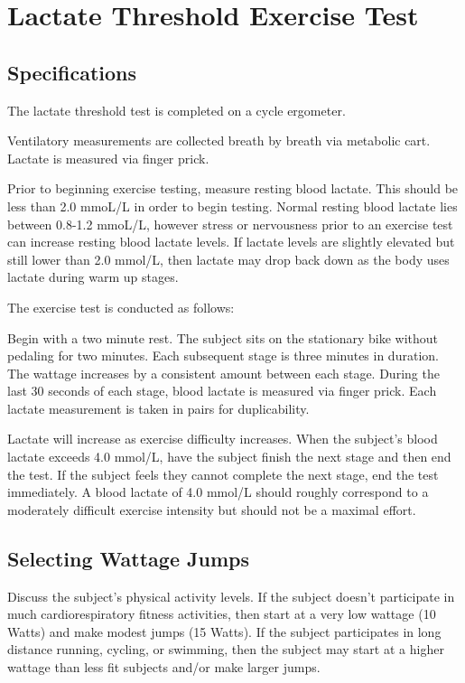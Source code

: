 \documentclass[
]{book}
\begin{document}
\hypertarget{ExerciseTesting-LT}{%
\section{Lactate Threshold Exercise Test}\label{ExerciseTesting-LT}}

\hypertarget{ExerciseTesting-LT-Specs}{%
\subsection{Specifications}\label{ExerciseTesting-LT-Specs}}

The lactate threshold test is completed on a cycle ergometer.

Ventilatory measurements are collected breath by breath via metabolic cart.
Lactate is measured via finger prick.

Prior to beginning exercise testing, measure resting blood lactate. This should be less than 2.0 mmoL/L in order to begin testing. Normal resting blood lactate lies between 0.8-1.2 mmoL/L, however stress or nervousness prior to an exercise test can increase resting blood lactate levels. If lactate levels are slightly elevated but still lower than 2.0 mmol/L, then lactate may drop back down as the body uses lactate during warm up stages.

The exercise test is conducted as follows:

Begin with a two minute rest. The subject sits on the stationary bike without pedaling for two minutes.
Each subsequent stage is three minutes in duration. The wattage increases by a consistent amount between each stage. During the last 30 seconds of each stage, blood lactate is measured via finger prick. Each lactate measurement is taken in pairs for duplicability.

Lactate will increase as exercise difficulty increases. When the subject's blood lactate exceeds 4.0 mmol/L, have the subject finish the next stage and then end the test. If the subject feels they cannot complete the next stage, end the test immediately. A blood lactate of 4.0 mmol/L should roughly correspond to a moderately difficult exercise intensity but should not be a maximal effort.

\hypertarget{ExerciseTesting-LT-Watts}{%
\subsection{Selecting Wattage Jumps}\label{ExerciseTesting-LT-Watts}}

Discuss the subject's physical activity levels. If the subject doesn't participate in much cardiorespiratory fitness activities, then start at a very low wattage (10 Watts) and make modest jumps (15 Watts). If the subject participates in long distance running, cycling, or swimming, then the subject may start at a higher wattage than less fit subjects and/or make larger jumps.
\end{document}
